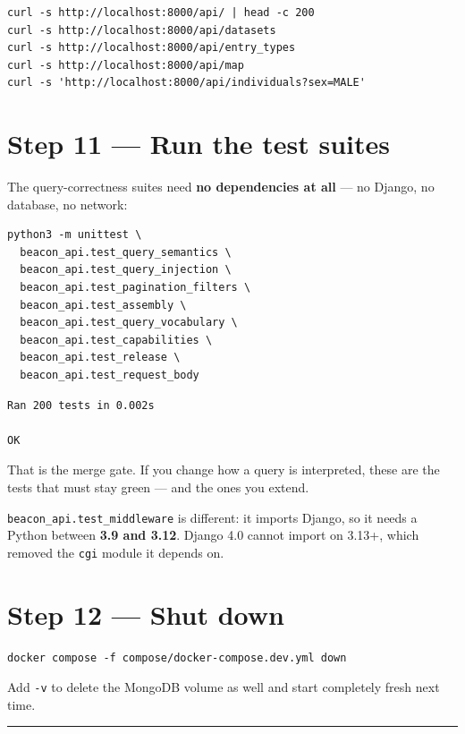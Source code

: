 \documentclass[
  10pt,
]{article}
\begin{document}
\begin{verbatim}
curl -s http://localhost:8000/api/ | head -c 200
curl -s http://localhost:8000/api/datasets
curl -s http://localhost:8000/api/entry_types
curl -s http://localhost:8000/api/map
curl -s 'http://localhost:8000/api/individuals?sex=MALE'
\end{verbatim}

\section{Step 11 --- Run the test
suites}\label{step-11-run-the-test-suites}

The query-correctness suites need \textbf{no dependencies at all} --- no
Django, no database, no network:

\begin{verbatim}
python3 -m unittest \
  beacon_api.test_query_semantics \
  beacon_api.test_query_injection \
  beacon_api.test_pagination_filters \
  beacon_api.test_assembly \
  beacon_api.test_query_vocabulary \
  beacon_api.test_capabilities \
  beacon_api.test_release \
  beacon_api.test_request_body
\end{verbatim}

\begin{verbatim}
Ran 200 tests in 0.002s

OK
\end{verbatim}

That is the merge gate. If you change how a query is interpreted, these
are the tests that must stay green --- and the ones you extend.

\texttt{beacon\_api.test\_middleware} is different: it imports Django,
so it needs a Python between \textbf{3.9 and 3.12}. Django 4.0 cannot
import on 3.13+, which removed the \texttt{cgi} module it depends on.

\section{Step 12 --- Shut down}\label{step-12-shut-down}

\begin{verbatim}
docker compose -f compose/docker-compose.dev.yml down
\end{verbatim}

Add \texttt{-v} to delete the MongoDB volume as well and start
completely fresh next time.

\begin{center}\rule{0.5\linewidth}{0.5pt}\end{center}
\end{document}
